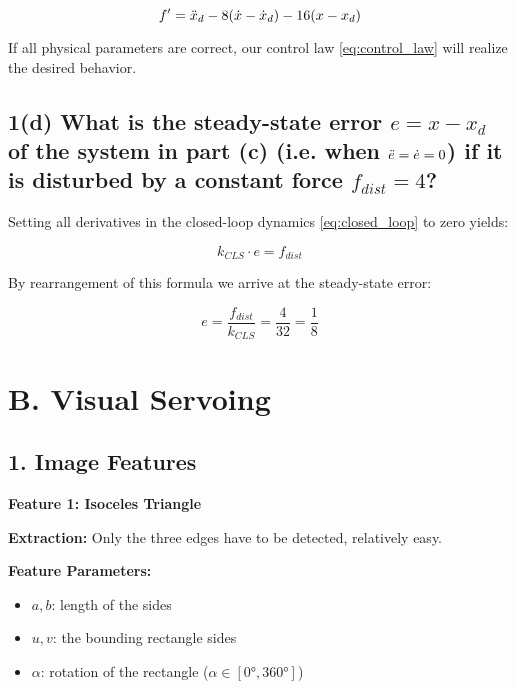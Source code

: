\documentclass[a4paper,10pt]{article}
\begin{document}
\begin{equation}
f' = \Ddot{x}_d - 8(\Dot{x} - \Dot{x}_d) - 16(x - x_d)
\end{equation}

If all physical parameters are correct, our control law \eqref{eq:control_law} will realize the desired behavior.

    
\subsection*{1(d) What is the steady-state error $e = x - x_d$ of the system in part (c) (i.e. when $\Ddot{e} = \Dot{e} = 0$) if it is disturbed by a constant force $f_{dist} = 4$?}

Setting all derivatives in the closed-loop dynamics \eqref{eq:closed_loop} to zero yields:

\begin{equation}
k_{CLS} \cdot e = f_{dist}
\end{equation}

By rearrangement of this formula we arrive at the steady-state error:

\begin{equation}
e = \frac{f_{dist}}{k_{CLS}} = \frac{4}{32} = \frac{1}{8}
\end{equation}    

\newpage


\section*{B. Visual Servoing}

\subsection*{1. Image Features}

\textbf{\large Feature 1: Isoceles Triangle}
	
\textbf{Extraction:} Only the three edges have to be detected, relatively easy.

\textbf{Feature Parameters:}
\begin{itemize}
 \item $a, b$: length of the sides
 \item $u, v$: the bounding rectangle sides
 \item $\alpha$: rotation of the rectangle ($\alpha \in [\ang{0}, \ang{360}]$)
\end{itemize}
\end{document}
